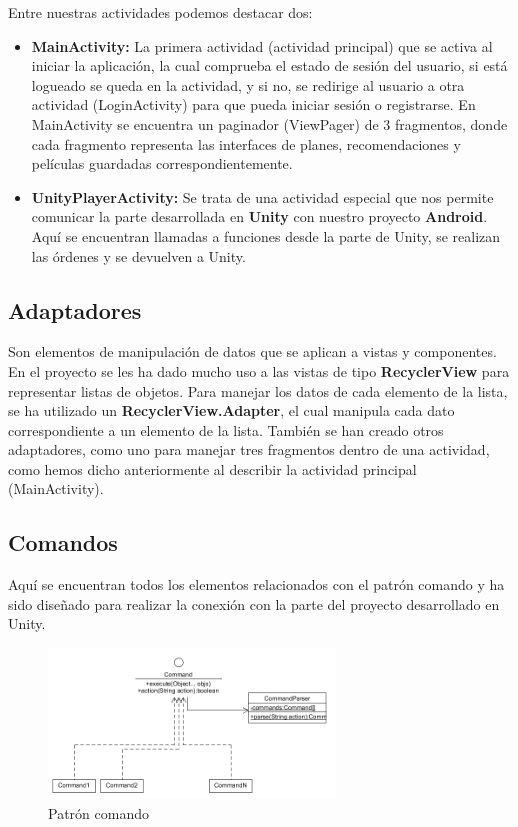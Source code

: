 Entre nuestras actividades podemos destacar dos: 
\begin{itemize}
    \item \textbf{MainActivity:} La primera actividad (actividad principal) que se activa al iniciar la aplicación, la cual comprueba el estado de sesión del usuario, si está logueado se queda en la actividad, y si no, se redirige al usuario a otra actividad (LoginActivity) para que pueda iniciar sesión o registrarse. En MainActivity se encuentra un paginador (ViewPager) de 3 fragmentos, donde cada fragmento representa las interfaces de planes, recomendaciones y películas guardadas correspondientemente.
    \item \textbf{UnityPlayerActivity:} Se trata de una actividad especial que nos permite comunicar la parte desarrollada en \textbf{Unity} con nuestro proyecto \textbf{Android}. Aquí se encuentran llamadas a funciones desde la parte de Unity, se realizan las órdenes y se devuelven a Unity.
\end{itemize} 

\subsection{Adaptadores}
\label{makereference4.3.2} 
Son elementos de manipulación de datos que se aplican a vistas y componentes. En el proyecto se les ha dado mucho uso a las vistas de tipo \textbf{RecyclerView} para representar listas de objetos. Para manejar los datos de cada elemento de la lista, se ha utilizado un \textbf{RecyclerView.Adapter}, el cual manipula cada dato correspondiente a un elemento de la lista. También se han creado otros adaptadores, como uno para manejar tres fragmentos dentro de una actividad, como hemos dicho anteriormente al describir la actividad principal (MainActivity).

\subsection{Comandos}
\label{makereference4.3.3}
Aquí se encuentran todos los elementos relacionados con el patrón comando y ha sido diseñado para realizar la conexión con la parte del proyecto desarrollado en Unity.

\begin{figure}[H]
    \centering
    \includegraphics[width=3in]{figures/chapter-4/command_pattern.png}
    \caption{Patrón comando}
\end{figure}

